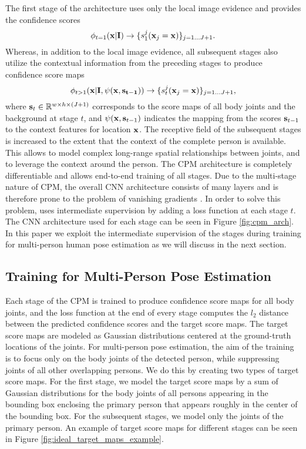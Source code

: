 \documentclass[runningheads]{llncs}
\begin{document}
The first stage of the architecture uses only the local image evidence and provides the confidence scores
\begin{equation}
\phi_{t=1}(\bold{x}|\bold{I}) \rightarrow \{s^j_1(\bold{x}_j = \bold{x})\}_{j=1 \dots J+1}.
\end{equation}
Whereas, in addition to the local image evidence, all subsequent stages also utilize the contextual information from the preceding stages to produce confidence score maps
\begin{equation}
\phi_{t>1}(\bold{x|\bold{I}, \psi(\bold{x}, \bold{s}_{t-1})}) \rightarrow \{s^j_t(\bold{x}_j = \bold{x})\}_{j=1 \dots J+1},
\end{equation}
where $\bold{s}_t \in \mathbb{R}^{w \times h \times (J+1)}$ corresponds to the score maps of all body joints and the background at stage $t$, and $\psi(\bold{x}, \bold{s}_{t-1})$ indicates the mapping from the scores  $\bold{s}_{t-1}$ to the context features for location $\bold{x}$. The receptive field of the subsequent stages is increased to the extent that the context of the complete person is available. This allows to model complex long-range spatial relationships between joints, and to leverage the context around the person. The CPM architecture is completely differentiable and allows end-to-end training of all stages. Due to the multi-stage nature of CPM, the overall CNN architecture consists of many layers and is therefore prone to the problem of vanishing gradients \cite{bengio1994learning, glorot2010understanding, wei2016convolutional}. In order to solve this problem, \cite{wei2016convolutional} uses intermediate supervision by adding a loss function at each stage $t$. The CNN architecture used for each stage can be seen in Figure \ref{fig:cpm_arch}. In this paper we exploit the intermediate supervision of the stages during training for multi-person human pose estimation as we will discuss in the next section. 
 
\subsection{Training for Multi-Person Pose Estimation}

Each stage of the CPM is trained to produce confidence score maps for all body joints, and the loss function at the end of every stage computes the $l_2$ distance between the predicted confidence scores and the target score maps. The target score maps are modeled as Gaussian distributions centered at the ground-truth locations of the joints. 
For multi-person pose estimation, the aim of the training is to focus only on the body joints of the detected person, while suppressing joints of all other overlapping persons. We do this by creating two types of target score maps. For the first stage, we model the target score maps by a sum of Gaussian distributions for the body joints of all persons appearing in the bounding box enclosing the primary person that appears roughly in the center of the bounding box. For the subsequent stages, we model only the joints of the primary person. 
An example of target score maps for different stages can be seen in Figure \ref{fig:ideal_target_maps_example}. 
\end{document}
